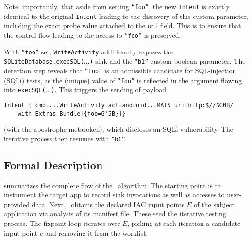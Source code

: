 Note, importantly, that aside from setting {\tt ``foo''}, the new {\tt Intent} is exactly identical to the original {\tt Intent} leading to the discovery of this custom parameter, including the exact probe value attached to the {\tt uri} field. This is to ensure that the control flow leading to the access to {\tt ``foo''} is preserved.

With {\tt ``foo''} set, {\tt WriteActivity} additionally exposes the {\tt SQLiteDatabase.execSQL($\ldots$)} sink and the {\tt ``b1''} custom boolean parameter. The detection step reveals that {\tt ``foo''} is an admissible candidate for SQL-injection (SQLi) tests, as the (unique) value of {\tt ``foo''} is reflected in the argument flowing into {\tt execSQL($\ldots$)}. This triggers the sending of payload
\begin{lstlisting}[numbers=none]
Intent { cmp=...WriteActivity act=android...MAIN uri=http:$//$G0B/
	with Extras Bundle[{foo=G'5B}]}
\end{lstlisting}
(with the apostrophe metatoken), which discloses an SQLi vulnerability. The iterative process then resumes with {\tt ``b1''}.
 
\subsection{Formal Description}

 summarizes the complete flow of the \Tool\ algorithm. The starting point is to instrument the target app to record sink invocations as well as accesses to user-provided data. Next, \Tool\ obtains the declared IAC input points $E$ of the subject application via analysis of its manifest file. These seed the iterative testing process. The fixpoint loop iterates over $E$, picking at each iteration a candidate input point $e$ and removing it from the worklist.

